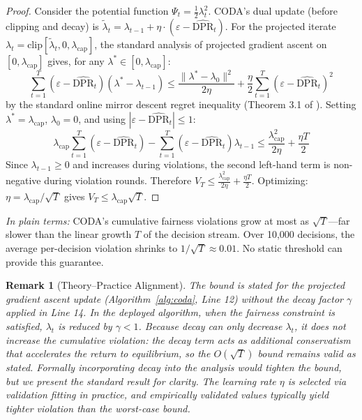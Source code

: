 \documentclass[letterpaper]{article} %
\newtheorem{remark}[theorem]{Remark}
\theoremstyle{definition}
\begin{document}
\begin{proof}
Consider the potential function $\Psi_t = \frac{1}{2}\lambda_t^2$. CODA's dual update (before clipping and decay) is $\tilde{\lambda}_{t} = \lambda_{t-1} + \eta \cdot (\varepsilon - \widehat{\text{DPR}}_t)$.
For the projected iterate $\lambda_t = \text{clip}[\tilde{\lambda}_t, 0, \lambda_{\text{cap}}]$, the standard analysis of projected gradient ascent on $[0, \lambda_{\text{cap}}]$ gives, for any $\lambda^* \in [0, \lambda_{\text{cap}}]$:
\begin{equation}
\sum_{t=1}^T (\varepsilon - \widehat{\text{DPR}}_t)(\lambda^* - \lambda_{t-1}) \leq \frac{\|\lambda^* - \lambda_0\|^2}{2\eta} + \frac{\eta}{2}\sum_{t=1}^T (\varepsilon - \widehat{\text{DPR}}_t)^2
\end{equation}
by the standard online mirror descent regret inequality (Theorem 3.1 of \citealt{hazan2016introduction}). Setting $\lambda^* = \lambda_{\text{cap}}$, $\lambda_0 = 0$, and using $|\varepsilon - \widehat{\text{DPR}}_t| \leq 1$:
\[
\lambda_{\text{cap}} \sum_{t=1}^T (\varepsilon - \widehat{\text{DPR}}_t) - \sum_{t=1}^T (\varepsilon - \widehat{\text{DPR}}_t)\lambda_{t-1} \leq \frac{\lambda_{\text{cap}}^2}{2\eta} + \frac{\eta T}{2}
\]
Since $\lambda_{t-1} \geq 0$ and increases during violations, the second left-hand term is non-negative during violation rounds. Therefore $V_T \leq \frac{\lambda_{\text{cap}}^2}{2\eta} + \frac{\eta T}{2}$. Optimizing: $\eta = \lambda_{\text{cap}}/\sqrt{T}$ gives $V_T \leq \lambda_{\text{cap}}\sqrt{T}$.
\end{proof}

\emph{In plain terms:} CODA's cumulative fairness violations grow at most as $\sqrt{T}$---far slower than the linear growth $T$ of the decision stream. Over 10,000 decisions, the average per-decision violation shrinks to $1/\sqrt{T} \approx 0.01$. No static threshold can provide this guarantee.

\begin{remark}[Theory--Practice Alignment]
\label{rem:eta}
The bound is stated for the projected gradient ascent update (Algorithm~\ref{alg:coda}, Line 12) \emph{without} the decay factor $\gamma$ applied in Line 14. In the deployed algorithm, when the fairness constraint is satisfied, $\lambda_t$ is reduced by $\gamma < 1$. Because decay can only decrease $\lambda_t$, it does not increase the cumulative violation: the decay term acts as additional conservatism that accelerates the return to equilibrium, so the $O(\sqrt{T})$ bound remains valid as stated. Formally incorporating decay into the analysis would tighten the bound, but we present the standard result for clarity. The learning rate $\eta$ is selected via validation fitting in practice, and empirically validated values typically yield tighter violation than the worst-case bound.
\end{remark}
\end{document}
